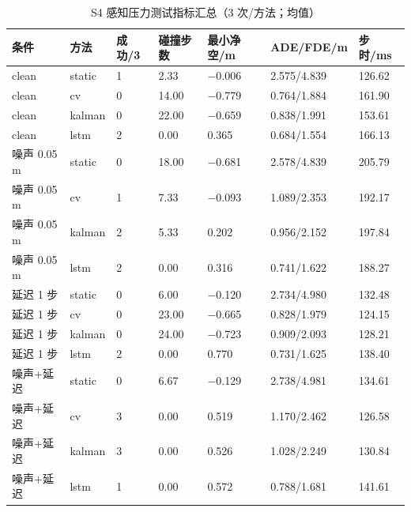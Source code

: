 \documentclass[10pt,a4paper,twocolumn]{ctexart}
\begin{document}
\begin{table}[t]
\centering
\small
\caption{S4 感知压力测试指标汇总（3 次/方法；均值）}
\label{tab:table-7}
\begin{tabularx}{\textwidth}{YYYYYYY}
\toprule
条件 & 方法 & 成功/3 & 碰撞步数 & 最小净空/m & ADE/FDE/m & 步时/ms \\
\midrule
clean & static & 1 & 2.33 & −0.006 & 2.575/4.839 & 126.62 \\
clean & cv & 0 & 14.00 & −0.779 & 0.764/1.884 & 161.90 \\
clean & kalman & 0 & 22.00 & −0.659 & 0.838/1.991 & 153.61 \\
clean & lstm & 2 & 0.00 & 0.365 & 0.684/1.554 & 166.13 \\
噪声 0.05 m & static & 0 & 18.00 & −0.681 & 2.578/4.839 & 205.79 \\
噪声 0.05 m & cv & 1 & 7.33 & −0.093 & 1.089/2.353 & 192.17 \\
噪声 0.05 m & kalman & 2 & 5.33 & 0.202 & 0.956/2.152 & 197.84 \\
噪声 0.05 m & lstm & 2 & 0.00 & 0.316 & 0.741/1.622 & 188.27 \\
延迟 1 步 & static & 0 & 6.00 & −0.120 & 2.734/4.980 & 132.48 \\
延迟 1 步 & cv & 0 & 23.00 & −0.665 & 0.828/1.979 & 124.15 \\
延迟 1 步 & kalman & 0 & 24.00 & −0.723 & 0.909/2.093 & 128.21 \\
延迟 1 步 & lstm & 2 & 0.00 & 0.770 & 0.731/1.625 & 138.40 \\
噪声+延迟 & static & 0 & 6.67 & −0.129 & 2.738/4.981 & 134.61 \\
噪声+延迟 & cv & 3 & 0.00 & 0.519 & 1.170/2.462 & 126.58 \\
噪声+延迟 & kalman & 3 & 0.00 & 0.526 & 1.028/2.249 & 130.84 \\
噪声+延迟 & lstm & 1 & 0.00 & 0.572 & 0.788/1.681 & 141.61 \\
\bottomrule
\end{tabularx}
\end{table}
\end{document}
